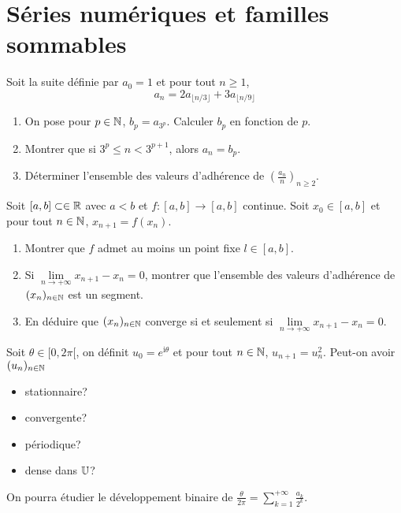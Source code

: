 \section{Séries numériques et familles sommables}

\begin{exercise}
	Soit la suite définie par $a_{0}=1$ et pour tout $n\geqslant1$,
	$$a_{n}=2a_{\lfloor n/3\rfloor}+3a_{\lfloor n/9\rfloor}$$
	\begin{enumerate}
		\item
		On pose pour $p\in\mathbb{N}$, $b_{p}=a_{3^p}$. Calculer $b_{p}$ en fonction de
		$p$.
		\item
		Montrer que si $3^{p}\leqslant n<3^{p+1}$, alors $a_{n}=b_{p}$.
		\item
		Déterminer l'ensemble des valeurs d'adhérence de
		$(\frac{a_{n}}{n})_{n\geqslant 2}$.
	\end{enumerate}
\end{exercise}

\begin{exercise}
	Soit $[a,b]\subset\in\mathbb{R}$ avec $a<b$ et $f:[a,b]\to[a,b]$ continue. Soit
	$x_{0}\in[a,b]$ et pour tout $n\in\mathbb{N}$, $x_{n+1}=f(x_{n})$.
	\begin{enumerate}
		\item
		Montrer que $f$ admet au moins un point fixe $l\in[a,b]$.
		\item
		Si $\lim\limits_{n\to+\infty}x_{n+1}-x_{n}=0$, montrer que l'ensemble des
		valeurs d'adhérence de $(x_{n})_{n\in\mathbb{N}}$ est un segment.
		\item
		En déduire que $(x_{n})_{n\in\mathbb{N}}$ converge si et seulement si
		$\lim\limits_{n\to+\infty}x_{n+1}-x_{n}=0$.
	\end{enumerate}
\end{exercise}

\begin{exercise}
	Soit $\theta\in[0,2\pi[$, on définit $u_{0}=e^{\mathrm{i}\theta}$ et pour tout
	$n\in\mathbb{N}$, $u_{n+1}=u_{n}^{2}$. Peut-on avoir $(u_{n})_{n\in\mathbb{N}}$
	\begin{itemize}
		\item
		stationnaire?
		\item
		convergente?
		\item
		périodique?
		\item
		dense dans $\mathbb{U}$?
	\end{itemize}
	On pourra étudier le développement binaire de
	$\frac{\theta}{2\pi}=\sum_{k=1}^{+\infty}\frac{a_{k}}{2^{k}}$.
\end{exercise}

